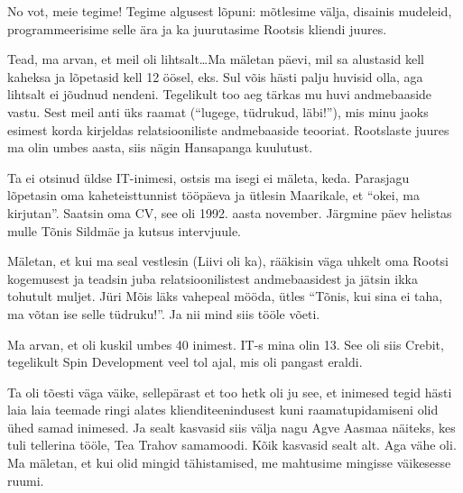 
No vot, meie tegime! Tegime algusest lõpuni: mõtlesime välja, disainis mudeleid, programmeerisime selle ära ja ka juurutasime Rootsis kliendi juures. 


Tead, ma arvan, et meil oli lihtsalt\ldots Ma  mäletan päevi, mil sa alustasid kell kaheksa ja lõpetasid kell 12 öösel, eks.  Sul võis hästi palju huvisid olla, aga lihtsalt ei jõudnud nendeni. Tegelikult too aeg tärkas mu huvi andmebaaside vastu. Sest meil anti üks raamat (\enquote{lugege, tüdrukud, läbi!}), mis minu jaoks esimest korda kirjeldas  relatsiooniliste andmebaaside teooriat. Rootslaste juures ma olin umbes aasta, siis  nägin Hansapanga kuulutust. 


Ta ei otsinud üldse IT-inimesi, ostsis ma isegi ei mäleta, keda. Parasjagu lõpetasin oma kaheteisttunnist tööpäeva ja ütlesin Maarikale, et \enquote{okei, ma kirjutan}. Saatsin oma CV, see oli 1992. aasta november. Järgmine päev helistas mulle Tõnis Sildmäe ja kutsus intervjuule. 

Mäletan, et kui ma seal vestlesin (Liivi oli ka), rääkisin väga uhkelt oma Rootsi kogemusest ja teadsin juba relatsioonilistest andmebaasidest ja jätsin ikka tohutult muljet.  Jüri Mõis läks vahepeal mööda, ütles \enquote{Tõnis, kui sina ei taha, ma võtan ise selle tüdruku!}.  Ja nii mind siis tööle võeti. 

Ma arvan, et  oli kuskil umbes 40 inimest. IT-s mina olin 13. See oli siis Crebit, tegelikult Spin Development veel tol ajal, mis oli pangast eraldi. 


Ta oli tõesti väga väike, sellepärast et too hetk oli ju see, et inimesed tegid hästi laia laia teemade ringi alates klienditeenindusest kuni raamatupidamiseni olid ühed samad inimesed. Ja sealt kasvasid siis välja nagu Agve Aasmaa näiteks, kes tuli tellerina tööle, Tea Trahov samamoodi. Kõik  kasvasid sealt alt. Aga vähe oli. Ma mäletan, et kui olid mingid tähistamised, me mahtusime mingisse väikesesse ruumi. 

